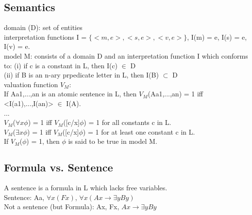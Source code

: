 \subsection*{Semantics}
domain (D): set of entities \\
interpretation functions I = $\{<m,e>, <s,e>, <v,e> \}$, I(m) = e, I(s) = e, I(v) = e. \\
model M: consists of a domain D and an interpretation function I which conforms to:
(i) if c is a constant in L, then I(c) $\in$ D\\
(ii) if B is an n-ary prpedicate letter in L, then I(B) $\subset$ D\\
valuation function $V_M$: \\
If Aa1,...,an is an atomic sentence in L, then $V_M$(Aa1,...,an) = 1 iff <I(a1),...,I(an)> $\in$ I(A). \\
... \\
$V_M$($\forall x \phi$) = 1 iff $V_M$([c/x]$\phi$) = 1 for all constants c in L. \\
$V_M$($\exists x \phi$) = 1 iff $V_M$([c/x]$\phi$) = 1 for at least one constant c in L. \\
If $V_M$($\phi$) = 1, then $\phi$ is said to be true in model M.
\subsection*{Formula vs. Sentence}
A sentence is a formula in L which lacks free variables. \\
Sentence: Aa, $\forall x (Fx)$, $\forall x (Ax \to \exists y By)$ \\
Not a sentence (but Formula): Ax, Fx, $Ax \to \exists y By$